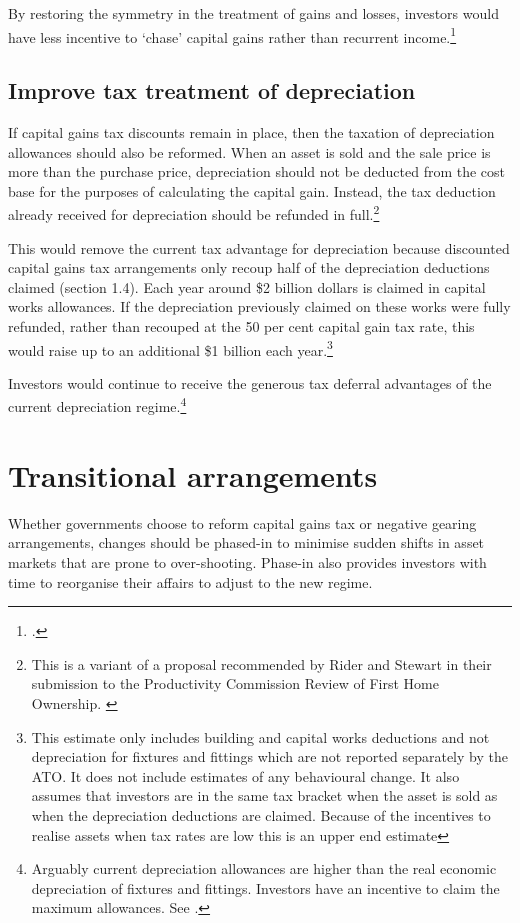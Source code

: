 \documentclass{grattan}\usepackage[]{graphicx}\usepackage[]{color}
\begin{document}
By restoring the symmetry in the treatment of gains and losses, investors would have less incentive to `chase' capital gains rather than recurrent income.\footcite[p.~418]{Treasury2010}

\subsection{Improve tax treatment of depreciation}
If capital gains tax discounts remain in place, then the taxation of depreciation allowances should also be reformed. When an asset is sold and the sale price is more than the purchase price, depreciation should not be deducted from the cost base for the purposes of calculating the capital gain. Instead, the tax deduction already received for depreciation should be refunded in full.\footnote{This is a variant of a proposal recommended by Rider and Stewart in their submission to the Productivity Commission Review of First Home Ownership. \textcite{Rider2004}}

This would remove the current tax advantage for depreciation because discounted capital gains tax arrangements only recoup half of the depreciation deductions claimed (section 1.4).  Each year around \$2 billion dollars is claimed in capital works allowances. If the depreciation previously claimed on these works were fully refunded, rather than recouped at the 50 per cent capital gain tax rate, this would raise up to an additional \$1 billion each year.\footnote{This estimate only includes building and capital works deductions and not depreciation for fixtures and fittings which are not reported separately by the ATO.  It does not include estimates of any behavioural change. It also assumes that investors are in the same tax bracket when the asset is sold as when the depreciation deductions are claimed. Because of the incentives to realise assets when tax rates are low this is an upper end estimate}

Investors would continue to receive the generous tax deferral advantages of the current depreciation regime.\footnote{Arguably current depreciation allowances are higher than the real economic depreciation of fixtures and fittings. Investors have an incentive to claim the maximum allowances. See \textcite[pp.~130-131]{Commission2004}.}

\section{Transitional arrangements}\label{sec:transitional_arrangements}
Whether governments choose to reform capital gains tax or negative gearing arrangements, changes should be phased-in to minimise sudden shifts in asset markets that are prone to over-shooting. Phase-in also provides investors with time to reorganise their affairs to adjust to the new regime.
\end{document}
